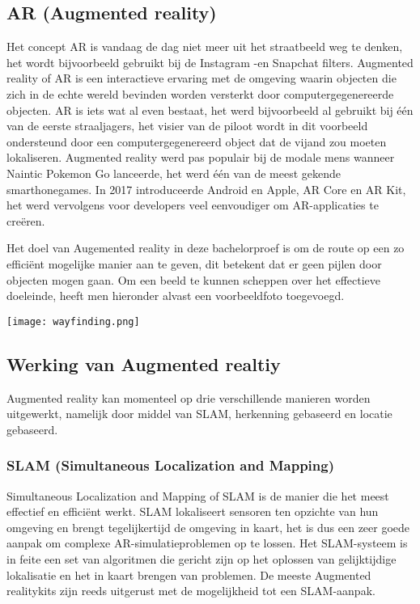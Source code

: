 \subsection{AR (Augmented reality)}
Het concept AR is vandaag de dag niet meer uit het straatbeeld weg te denken, het wordt bijvoorbeeld gebruikt bij de Instagram -en Snapchat filters. Augmented reality of AR is een interactieve ervaring met de omgeving waarin objecten die zich in de echte wereld bevinden worden versterkt door computergegenereerde objecten. AR is iets wat al even bestaat, het werd bijvoorbeeld al gebruikt bij één van de eerste straaljagers, het visier van de piloot wordt in dit voorbeeld ondersteund door een computergegenereerd object dat de vijand zou moeten lokaliseren. Augmented reality werd pas populair bij de modale mens wanneer Naintic Pokemon Go lanceerde, het werd één van de meest gekende smarthonegames. In 2017 introduceerde Android en Apple, AR Core en AR Kit, het werd vervolgens voor developers veel eenvoudiger om AR-applicaties te creëren.

Het doel van Augemented reality in deze bachelorproef is om de route op een zo efficiënt mogelijke manier aan te geven, dit betekent dat er geen pijlen door objecten mogen gaan. Om een beeld te kunnen scheppen over het effectieve doeleinde, heeft men hieronder alvast een voorbeeldfoto toegevoegd.

\begin{center}
	\texttt{[image: wayfinding.png]}
\end{center}

\subsection{Werking van Augmented realtiy}
Augmented reality kan momenteel op drie verschillende manieren worden uitgewerkt, namelijk door middel van SLAM, herkenning gebaseerd en locatie gebaseerd.

\subsubsection{SLAM (Simultaneous Localization and Mapping)}
Simultaneous Localization and Mapping of SLAM is de manier die het meest effectief en efficiënt werkt. SLAM lokaliseert sensoren ten opzichte van hun omgeving en brengt tegelijkertijd de omgeving in kaart, het is dus een zeer goede aanpak om complexe AR-simulatieproblemen op te lossen. Het SLAM-systeem is in feite een set van algoritmen die gericht zijn op het oplossen van gelijktijdige lokalisatie en het in kaart brengen van problemen. De meeste Augmented realitykits zijn reeds uitgerust met de mogelijkheid tot een SLAM-aanpak.

